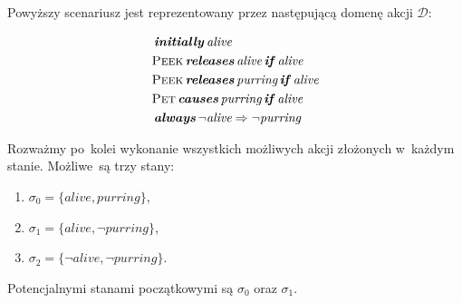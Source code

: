 \documentclass[11pt,a4paper]{article}
\DeclareMathOperator{\Initially}{\textbf{\textit{initially}}}
\DeclareMathOperator{\Causes}{\textbf{\textit{causes}}}
\DeclareMathOperator{\If}{\textbf{\textit{if}}}
\DeclareMathOperator{\Releases}{\textbf{\textit{releases}}}
\DeclareMathOperator{\Always}{\textbf{\textit{always}}}
\begin{document}
Powyższy scenariusz jest reprezentowany przez następującą domenę akcji $\mathcal{D}$:

\begin{align*}
    & \Initially \textit{alive} \\
    & \textsc{Peek} \Releases \textit{alive} \If \textit{alive} \\
    & \textsc{Peek} \Releases \textit{purring} \If \textit{alive} \\
    & \textsc{Pet} \Causes \textit{purring} \If  \textit{alive} \\
    & \Always \neg \textit{alive} \Rightarrow \neg \textit{purring}
\end{align*}

Rozważmy po~kolei wykonanie wszystkich możliwych akcji złożonych w~każdym stanie. Możliwe~są trzy stany:

\begin{enumerate}
    \item $\sigma_0 = \{ \textit{alive}, \textit{purring} \}$,
    \item $\sigma_1 = \{ \textit{alive}, \neg \textit{purring} \}$,
    \item $\sigma_2 = \{ \neg \textit{alive}, \neg \textit{purring} \}$.
\end{enumerate}

Potencjalnymi stanami początkowymi są $\sigma_0$ oraz $\sigma_1$.
\end{document}
